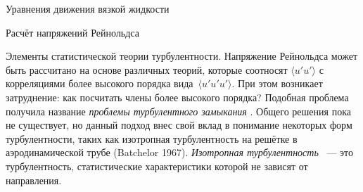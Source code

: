 \begin{chapter}{Уравнения движения вязкой жидкости}
\begin{section}{Расчёт напряжений Рейнольдса}
\begin{paragraph}{Элементы статистической теории турбулентности.}
Напряжение Рейнольдса может быть рассчитано на основе различных теорий,
которые соотносят $\langle u'u' \rangle$ с корреляциями более высокого
порядка вида~$\langle u'u'u' \rangle$. При этом возникает затруднение: как
посчитать члены более высокого порядка? Подобная проблема получила название
\emph{проблемы турбулентного замыкания}%
. Общего решения пока
не существует, но данный подход внес свой вклад в понимание некоторых 
форм турбулентности, таких как изотропная турбулентность на решётке 
в аэродинамической трубе (Batchelor 1967). 
\emph{Изотропная турбулентность}%
~--- это турбулентность,
статистические характеристики которой не зависят от направления.
%


\end{paragraph}
\end{section}
\end{chapter}
